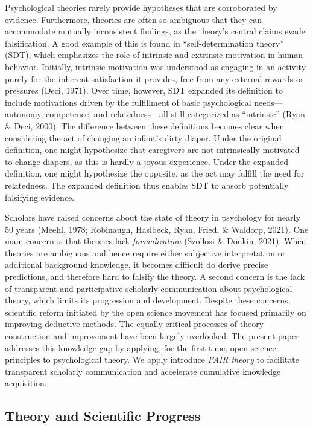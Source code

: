 \documentclass[
  man, noextraspace,floatsintext]{apa6}
\begin{document}
Psychological theories rarely provide hypotheses that are corroborated by evidence.
Furthermore, theories are often so ambiguous that they can accommodate mutually inconsistent findings,
as the theory's central claims evade falsification.
A good example of this is found in ``self-determination theory'' (SDT), which emphasizes the role of intrinsic and extrinsic motivation in human behavior.
Initially, intrinsic motivation was understood as engaging in an activity purely for the inherent satisfaction it provides, free from any external rewards or pressures (Deci, 1971).
Over time, however, SDT expanded its definition to include motivations driven by the fulfillment of basic psychological needs---autonomy, competence, and relatedness---all still categorized as ``intrinsic'' (Ryan \& Deci, 2000).
The difference between these definitions becomes clear when considering the act of changing an infant's dirty diaper.
Under the original definition, one might hypothesize that caregivers are not intrinsically motivated to change diapers, as this is hardly a joyous experience.
Under the expanded definition, one might hypothesize the opposite, as the act may fulfill the need for relatedness.
The expanded definition thus enables SDT to absorb potentially falsifying evidence.

Scholars have raised concerns about the state of theory in psychology for nearly 50 years (Meehl, 1978; Robinaugh, Haslbeck, Ryan, Fried, \& Waldorp, 2021).
One main concern is that theories lack \emph{formalization} (Szollosi \& Donkin, 2021).
When theories are ambiguous and hence require either subjective interpretation or additional background knowledge,
it becomes difficult do derive precise predictions,
and therefore hard to falsify the theory.
A second concern is the lack of transparent and participative scholarly communication about psychological theory, which limits its progression and development.
Despite these concerns, scientific reform initiated by the open science movement has focused primarily on improving deductive methods.
The equally critical processes of theory construction and improvement have been largely overlooked.
The present paper addresses this knowledge gap by applying, for the first time,
open science principles to psychological theory.
We apply introduce \emph{FAIR theory} to
facilitate transparent scholarly communication and accelerate cumulative knowledge acquisition.

\subsection{Theory and Scientific Progress}\label{theory-and-scientific-progress}
\end{document}
